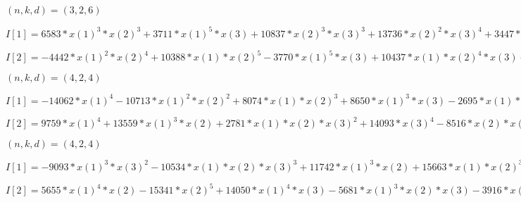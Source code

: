 \begin{example}[Example 2]
$(n,k,d) = (3,2,6)$

$I[1]=6583*x(1)^3*x(2)^3+3711*x(1)^5*x(3)+10837*x(2)^3*x(3)^3+13736*x(2)^2*x(3)^4+3447*x(1)*x(3)^5+15207*x(1)^4*x(2)+11703*x(1)^3*x(2)*x(3)+3400*x(1)^2*x(2)^2*x(3)-4777*x(2)^2*x(3)^3-9450*x(1)*x(3)^4+12281*x(2)^4+12654*x(1)*x(2)^2*x(3)-3399*x(2)^3*x(3)+14074*x(1)^2*x(3)^2+11120*x(2)^2*x(3)^2-3736*x(1)^3+986*x(1)*x(2)^2+13839*x(3)^3+6312*x(1)*x(2)-12719*x(2)^2$

$I[2]=-4442*x(1)^2*x(2)^4+10388*x(1)*x(2)^5-3770*x(1)^5*x(3)+10437*x(1)*x(2)^4*x(3)-14311*x(2)^5*x(3)+14214*x(1)^3*x(3)^3-14018*x(1)*x(2)*x(3)^4-15654*x(2)^2*x(3)^4+8115*x(1)*x(3)^5+15403*x(1)^5+4638*x(1)^3*x(2)^2-3328*x(1)^4*x(3)-9687*x(1)*x(2)^3*x(3)+12945*x(1)^2*x(3)^3+8291*x(3)^5-2999*x(1)^3*x(2)+15733*x(1)*x(2)^3+15017*x(3)^4+10254*x(1)^2*x(2)-5593*x(2)*x(3)^2-13728*x(1)*x(3)-6288*x(1)-11837*x(2)+6259$
\end{example}

\begin{example}[Example 3]
$(n,k,d) = (4,2,4)$

$I[1]=-14062*x(1)^4-10713*x(1)^2*x(2)^2+8074*x(1)*x(2)^3+8650*x(1)^3*x(3)-2695*x(1)*x(2)^2*x(3)-10554*x(2)^3*x(3)+9231*x(1)*x(2)*x(3)^2+5304*x(2)*x(3)^3+11981*x(1)*x(2)^2*x(4)-12596*x(2)^3*x(4)+12305*x(1)^2*x(3)*x(4)-11072*x(1)*x(3)^2*x(4)-15361*x(3)^3-3162*x(1)*x(2)*x(4)+1360*x(1)*x(3)*x(4)+3083*x(2)*x(3)*x(4)-11468*x(3)*x(4)^2+13610*x(4)^3+11905*x(1)*x(2)+13479*x(3)*x(4)+2920*x(4)^2+13870*x(4)-6307$

$I[2]=9759*x(1)^4+13559*x(1)^3*x(2)+2781*x(1)*x(2)*x(3)^2+14093*x(3)^4-8516*x(2)*x(3)^2*x(4)+10864*x(1)*x(3)*x(4)^2+11615*x(2)^2*x(3)-9959*x(2)*x(3)^2-15549*x(1)*x(2)*x(4)+808*x(1)*x(3)*x(4)-13657*x(1)^2+2150*x(1)*x(2)-10422*x(1)$
\end{example}

\begin{example}[Example 4]
$(n,k,d) = (4,2,4)$

$I[1]=-9093*x(1)^3*x(3)^2-10534*x(1)*x(2)*x(3)^3+11742*x(1)^3*x(2)+15663*x(1)*x(2)^3+2863*x(1)^2*x(3)^2+13793*x(2)^2*x(3)+6384*x(2)*x(3)^2+658*x(1)*x(2)+11282*x(2)+9915$

$I[2]=5655*x(1)^4*x(2)-15341*x(2)^5+14050*x(1)^4*x(3)-5681*x(1)^3*x(2)*x(3)-3916*x(1)^2*x(2)^2*x(3)+12778*x(1)*x(2)^2*x(3)^2+181*x(2)^3*x(3)^2+13247*x(1)^2*x(3)^3+15407*x(2)*x(3)^4-12780*x(1)*x(2)^3-9067*x(2)^4-15783*x(1)^2*x(2)*x(3)-15875*x(1)^2*x(3)^2+5179*x(3)^4+376*x(1)*x(2)^2+5183*x(2)^3-14365*x(2)^2*x(3)+6334*x(1)*x(2)+10386*x(2)^2-3186*x(3)$
\end{example}

